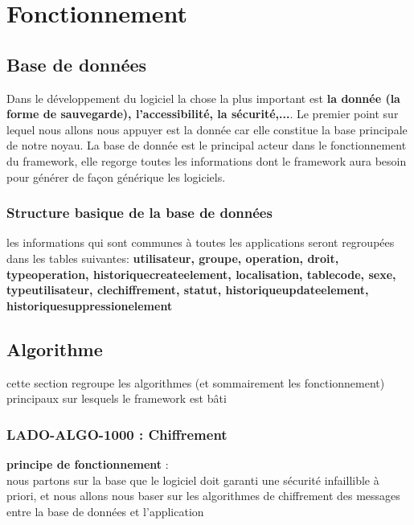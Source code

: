 \documentclass[12pt,a4paper]{report}
\begin{document}
\section{Fonctionnement}
\subsection{Base de données}
	Dans le développement du logiciel la chose la plus important est \textbf{la donnée (la forme de sauvegarde), l'accessibilité, la sécurité,...}. Le premier point sur lequel nous allons nous appuyer est la donnée car elle constitue la base principale de notre noyau. La base de donnée est le principal acteur dans le fonctionnement du framework, elle regorge toutes les informations dont le framework aura besoin pour générer de façon générique les logiciels. 
\subsubsection{Structure basique de la base de données}
les informations qui sont communes à toutes les applications seront regroupées dans les tables suivantes: \textbf{utilisateur, groupe, operation, droit, typeoperation, historiquecreateelement, localisation, tablecode, sexe, typeutilisateur, clechiffrement, statut, historiqueupdateelement, historiquesuppressionelement}

\subsection{Algorithme}
cette section regroupe les algorithmes (et sommairement les fonctionnement) principaux sur lesquels le framework est bâti 
\subsubsection{LADO-ALGO-1000 : Chiffrement}
\textbf{principe de fonctionnement} : \\
nous partons sur la base que le logiciel doit garanti une sécurité infaillible à priori, et nous allons nous baser sur les algorithmes de chiffrement des messages entre la base de données et l'application
\end{document}
